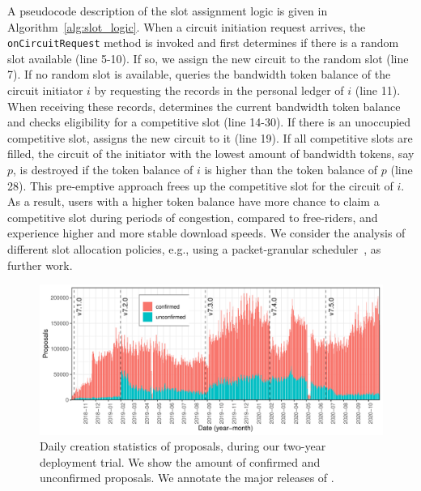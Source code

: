 A pseudocode description of the slot assignment logic is given in Algorithm~\ref{alg:slot_logic}.
When a circuit initiation request arrives, the \texttt{onCircuitRequest} method is invoked and \Tribler{} first determines if there is a random slot available (line 5-10).
If so, we assign the new circuit to the random slot (line 7).
If no random slot is available, \Tribler{} queries the bandwidth token balance of the circuit initiator $ i $ by requesting the records in the personal ledger of $ i $ (line 11).
When receiving these records, \Tribler{} determines the current bandwidth token balance and checks eligibility for a competitive slot (line 14-30).
If there is an unoccupied competitive slot, \Tribler{} assigns the new circuit to it (line 19).
If all competitive slots are filled, the circuit of the initiator with the lowest amount of bandwidth tokens, say $ p $, is destroyed if the token balance of $ i $ is higher than the token balance of $ p $ (line 28).
This pre-emptive approach frees up the competitive slot for the circuit of $ i $.
As a result, users with a higher token balance have more chance to claim a competitive slot during periods of congestion, compared to free-riders, and experience higher and more stable download speeds.
We consider the analysis of different slot allocation policies, e.g., using a packet-granular scheduler~\cite{jansen2018kist}, as further work.


\begin{figure}[!t]
	\centering
	\includegraphics[width=\linewidth]{trustchain/assets/record_creation}
	\caption{Daily creation statistics of proposals, during our two-year deployment trial. We show the amount of confirmed and unconfirmed proposals. We annotate the major releases of \Tribler{}.}
	\label{fig:record_creation}
\end{figure}

